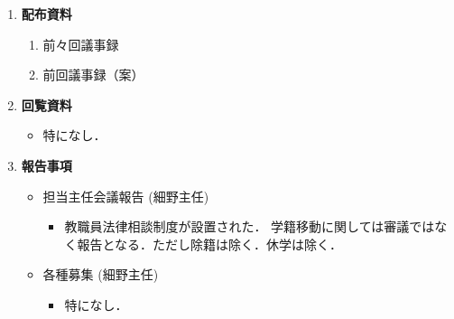 \documentclass[10.5pt,a4paper]{jsarticle}
\begin{document}
\begin{enumerate}[label=\arabic*：, leftmargin=2zw, labelsep=1zw, itemsep=1\baselineskip]
    \item \textbf{配布資料}
        \begin{enumerate}[label=・\ 資料\arabic*：, leftmargin=6zw, nosep]
            \item 前々回議事録
            \item 前回議事録（案）
        \end{enumerate}

    \item \textbf{回覧資料}
        \begin{itemize}[label=・, leftmargin=1.5zw, nosep]
            \item 特になし．
        \end{itemize}
    
    
        \item \textbf{報告事項}
            
		\begin{itemize}[label=・, leftmargin=1.5zw, itemsep=1\baselineskip]%
		\item 担当主任会議報告 (細野主任)
		\begin{itemize}[label=-, leftmargin=2zw, nosep]
			\item 
			教職員法律相談制度が設置された．
			学籍移動に関しては審議ではなく報告となる．ただし除籍は除く．休学は除く．
		\end{itemize}

		\item 各種募集 (細野主任)
		\begin{itemize}[label=-, leftmargin=2zw, nosep]
			\item 特になし．
		\end{itemize}


\end{itemize}
\end{enumerate}
\end{document}
